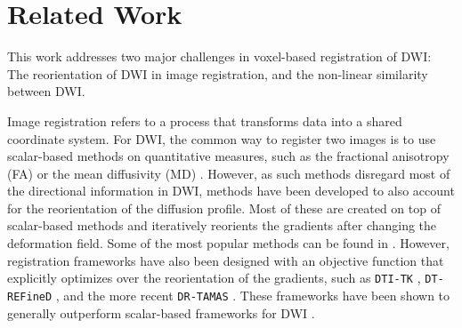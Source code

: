 \documentclass[twocolumn]{svjour3}
\begin{document}
\section{Related Work}

This work addresses two major challenges in voxel-based registration of DWI: The
reorientation of DWI in image registration, and the non-linear similarity between DWI.


Image registration refers to a process that transforms data into a shared coordinate
system. For DWI, the common way to register two images is to use scalar-based methods on
quantitative measures, such as the fractional anisotropy (FA) or the mean diffusivity (MD)
\cite{o2017advances}. However, as such methods disregard most of the directional
information in DWI, methods have been developed to also account for the reorientation of
the diffusion profile. Most of these are created on top of scalar-based methods and
iteratively reorients the gradients after changing the deformation field. Some of the most
popular methods can be found in
\cite{avants2009advanced,tournier2012mrtrix,jenkinson2012fsl,
  fischl2012freesurfer}. However, registration frameworks have also been designed with an
objective function that explicitly optimizes over the reorientation of the gradients, such
as \texttt{DTI-TK} \cite{zhang2006deformable}, \texttt{DT-REFineD} \cite{yeo2009dt}, and
the more recent \texttt{DR-TAMAS} \cite{irfanoglu2016dr}. These frameworks have been shown
to generally outperform scalar-based frameworks for DWI
\cite{wang2011dti,zhang2014large,wang2016evaluation,wang2017evaluations}. %

\end{document}
